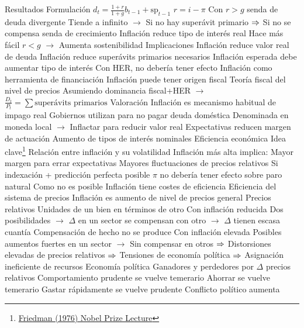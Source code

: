 \documentclass{nuevotema}
\begin{document}
\begin{esquemal}
				\4 Resultados
			\3 Formulación
				\4 $d_t = \frac{1+r}{1+g} b_{t-1} + \text{sp}_{t-1}$
				\4 $r = i - \pi$
				\4 Con $r>g$ senda de deuda divergente
				\4[] Tiende a infinito
				\4[] $\to$ Si no hay superávit primario
				\4[] $\Rightarrow$ Si no se compensa senda de crecimiento
				\4 Inflación reduce tipo de interés real
				\4[] Hace más fácil $r < g$
				\4[] $\to$ Aumenta sostenibilidad
			\3 Implicaciones
				\4 Inflación reduce valor real de deuda
				\4 Inflación reduce superávits primarios necesarios
				\4 Inflación esperada debe aumentar tipo de interés
				\4[] Con HER, no debería tener efecto
				\4 Inflación como herramienta de financiación
				\4 Inflación puede tener origen fiscal
				\4[] Teoría fiscal del nivel de precios
				\4[] Asumiendo dominancia fiscal+HER
				\4[] $\to$ $\frac{D_t}{P_t} = \sum \text{superávits primarios}$
			\3 Valoración
				\4 Inflación es mecanismo habitual de impago real
				\4 Gobiernos utilizan para no pagar deuda doméstica
				\4[] Denominada en moneda local
				\4[] $\to$ Inflactar para reducir valor real
				\4 Expectativas reducen margen de actuación
				\4[] Aumento de tipos de interés nominales
		\2 Eficiencia económica
			\3 Idea clave\footnote{\href{https://www.nobelprize.org/uploads/2018/06/friedman-lecture-1.pdf}{Friedman (1976) Nobel Prize Lecture}}
				\4 Relación entre inflación y su volatilidad
				\4 Inflación más alta implica:
				\4[] Mayor margen para errar expectativas
				\4[] Mayores fluctuaciones de precios relativos
				\4 Si indexación + predicción perfecta posible
				\4[] $\pi$ no debería tener efecto sobre paro natural
				\4 Como no es posible
				\4[] Inflación tiene costes de eficiencia
			\3 Eficiencia del sistema de precios
				\4 Inflación es aumento de nivel de precios general
				\4 Precios relativos
				\4[] Unidades de un bien en términos de otro
				\4 Con inflación reducida
				\4[] Dos posibilidades
				\4[] $\to$ $\Delta$ en un sector se compensan con otro
				\4[] $\to$ $\Delta$ tienen escasa cuantía
				\4[] Compensación de hecho no se produce
				\4 Con inflación elevada
				\4[] Posibles aumentos fuertes en un sector
				\4[] $\to$ Sin compensar en otros
				\4[] $\Rightarrow$ Distorsiones elevadas de precios relativos
				\4[] $\Rightarrow$ Tensiones de economía política
				\4[] $\Rightarrow$ Asignación ineficiente de recursos
			\3 Economía política
				\4 Ganadores y perdedores por $\Delta$ precios relativos
				\4 Comportamiento prudente se vuelve temerario
				\4[] Ahorrar se vuelve temerario
				\4[] Gastar rápidamente se vuelve prudente
				\4 Conflicto político aumenta

\end{esquemal}
\end{document}
